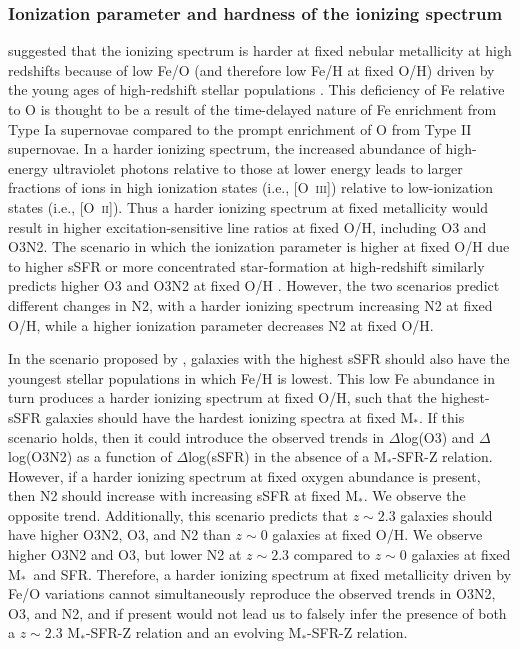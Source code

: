 \documentclass[iop,twocolappendix]{emulateapj}
\newcommand{\mstar}{$\mbox{M}_*$}
\newcommand{\ii}{~\textsc{ii}}
\newcommand{\iii}{~\textsc{iii}}
\begin{document}
\subsubsection{Ionization parameter and hardness of the ionizing spectrum}

\citet{ste16} suggested that the ionizing spectrum is harder at fixed nebular metallicity at
 high redshifts because of low Fe/O (and therefore low Fe/H at fixed O/H)
 driven by the young ages of high-redshift stellar populations
 \citep[see also][]{str17}.  This deficiency of Fe relative to O is thought to be a result of the time-delayed nature
 of Fe enrichment from Type Ia supernovae compared to the prompt enrichment of O from
 Type II supernovae.
  In a harder ionizing spectrum, the increased abundance of high-energy ultraviolet photons
 relative to those at lower energy leads
 to larger fractions of ions in high ionization states (i.e., [O\iii]) relative to low-ionization
 states (i.e., [O\ii]).  Thus a harder ionizing spectrum at fixed metallicity would result in higher
 excitation-sensitive line ratios at fixed O/H, including O3 and O3N2.  The scenario in which the ionization
 parameter is higher at fixed O/H due to higher sSFR or more concentrated star-formation at high-redshift
 similarly predicts higher O3 and O3N2 at fixed O/H \citep{kew13,kew16,kas17}.
  However, the two scenarios predict different changes in N2, with a harder ionizing spectrum
 increasing N2 at fixed O/H, while a higher ionization parameter decreases N2 at fixed O/H.

In the scenario proposed by \citet{ste16}, galaxies with the highest sSFR should also have the youngest
 stellar populations in which Fe/H is lowest.  This low Fe abundance in turn
 produces a harder ionizing spectrum at fixed O/H, such that the highest-sSFR galaxies should have
 the hardest ionizing spectra at fixed \mstar.
  If this scenario holds, then it could introduce the observed trends in
$\Delta$log(O3) and $\Delta$log(O3N2) as a function of $\Delta$log(sSFR) in the absence
 of a \mstar-SFR-Z relation.
  However, if a harder ionizing spectrum at fixed oxygen abundance is present, then N2 should
 increase with increasing sSFR at fixed \mstar.  We observe the opposite trend.
  Additionally, this scenario predicts that $z\sim2.3$ galaxies should have higher O3N2, O3,
 and N2 than $z\sim0$ galaxies at fixed O/H.  We observe higher O3N2 and O3, but lower N2
 at $z\sim2.3$ compared to $z\sim0$ galaxies at fixed \mstar\ and SFR.
  Therefore, a harder ionizing spectrum at fixed metallicity driven by Fe/O variations
 cannot simultaneously reproduce the observed trends in O3N2, O3, and N2, and if present would not
 lead us to falsely infer the presence of both a $z\sim2.3$ \mstar-SFR-Z relation and
 an evolving \mstar-SFR-Z relation.
\end{document}
